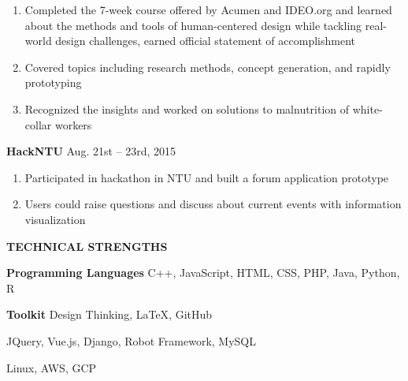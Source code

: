 \documentclass[12pt]{article}
\begin{document}
	\begin{enumerate}

		\item Completed the 7-week course offered by Acumen and IDEO.org and learned about the methods and tools of human-centered design while tackling real-world design challenges, earned official statement of accomplishment

		\item Covered topics including research methods, concept generation, and rapidly prototyping

		\item Recognized the insights and worked on solutions to malnutrition of white-collar workers

	\end{enumerate}

	\vspace{0.5em}

	\textbf{HackNTU} \hfill Aug. 21st -- 23rd, 2015

	\begin{enumerate}

		\item Participated in hackathon in NTU and built a forum application prototype

		\item Users could raise questions and discuss about current events with information visualization

	\end{enumerate}

	\vspace{1em}

\textbf{\large{\uppercase{Technical Strengths}}}
\hrulefill{}

	\vspace{0.5em}

	\textbf{Programming Languages} \hfill C++, JavaScript, HTML, CSS, PHP, Java, Python, R

	\vspace{0.5em}

	\textbf{Toolkit} \hfill Design Thinking, LaTeX, GitHub

	\hfill JQuery, Vue.js, Django, Robot Framework, MySQL

	\hfill Linux, AWS, GCP
\end{document}
